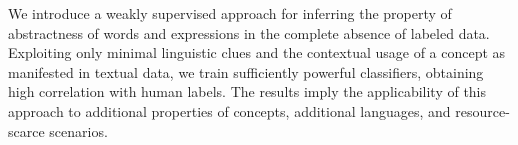 We introduce a weakly supervised approach for inferring the property of abstractness of words and expressions in the complete absence of labeled data. Exploiting only minimal linguistic clues and the contextual usage of a concept as manifested in textual data, we train sufficiently powerful classifiers, obtaining high correlation with human labels. The results imply the applicability of this approach to additional properties of concepts, additional languages, and resource-scarce scenarios.
